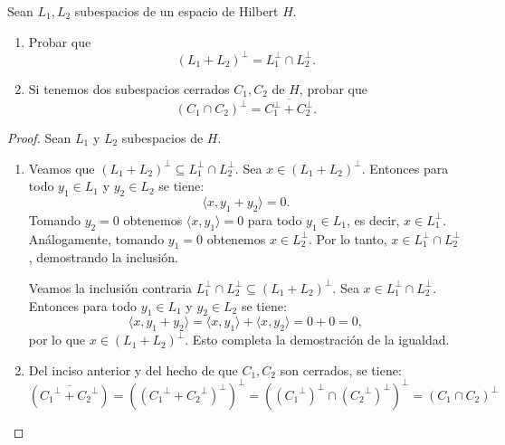 \documentclass{article}
\theoremstyle{definition}
\newcommand{\cl}[1]{\overline{#1}}                       %
\newenvironment{ejercicio}[1]{\begin{trivlist}
\item[\hskip \labelsep {\bfseries Ejercicio}\hskip \labelsep {\bfseries #1.}]}{\end{trivlist}}
\begin{document}
\vspace{0.5cm}

\begin{ejercicio}{10}
	Sean \( L_1, L_2 \) subespacios de un espacio de Hilbert \( H \).
	\begin{enumerate}
		\item Probar que
		      \[ {(L_1 + L_2)}^{\perp} = L_1^{\perp} \cap L_2^{\perp}. \]
		\item Si tenemos dos subespacios cerrados \( C_1, C_2 \) de \( H \), probar que
		      \[ {(C_1 \cap C_2)}^{\perp} = \cl{C_1^{\perp} + C_2^{\perp}}. \]
	\end{enumerate}
\end{ejercicio}
\begin{proof}
	Sean \( L_1 \) y \( L_2 \) subespacios de \( H \).\begin{enumerate}
		\item Veamos que \( {(L_1 + L_2)}^{\perp} \subseteq L_1^{\perp} \cap L_2^{\perp} \). Sea \( x \in {(L_1 + L_2)}^{\perp} \). Entonces para todo \( y_1 \in L_1 \) y \( y_2 \in L_2 \) se tiene:\[
			      \langle x, y_1 + y_2 \rangle = 0.
		      \]
		      Tomando \( y_2 = 0 \) obtenemos \( \langle x, y_1 \rangle = 0 \) para todo \( y_1 \in L_1 \), es decir, \( x \in L_1^{\perp} \). Análogamente, tomando \( y_1 = 0 \) obtenemos \( x \in L_2^{\perp} \). Por lo tanto, \( x \in L_1^{\perp} \cap L_2^{\perp} \), demostrando la inclusión.

		      Veamos la inclusión contraria \( L_1^{\perp} \cap L_2^{\perp} \subseteq {(L_1 + L_2)}^{\perp} \). Sea \( x \in L_1^{\perp} \cap L_2^{\perp} \). Entonces para todo \( y_1 \in L_1 \) y \( y_2 \in L_2 \) se tiene:
		      \[
			      \langle x, y_1 + y_2 \rangle = \langle x, y_1 \rangle + \langle x, y_2 \rangle = 0 + 0 = 0,
		      \]
		      por lo que \( x \in {(L_1 + L_2)}^{\perp} \). Esto completa la demostración de la igualdad.
		\item Del inciso anterior y del hecho de que \( C_1, C_2 \) son cerrados, se tiene: \[
			      \left( \overline{{C_1}^\perp + {C_2}^\perp} \right) = {\left( {({C_1}^\perp + {C_2}^\perp)}^\perp \right)}^\perp = {\left( {({C_1}^\perp)}^\perp \cap {({C_2}^\perp)}^\perp \right)}^\perp = {(C_1 \cap C_2)}^\perp
		      \]
	\end{enumerate}
\end{proof}
\end{document}
